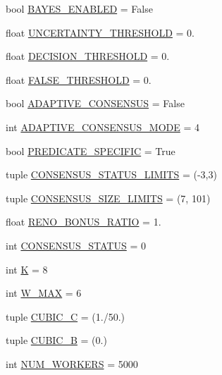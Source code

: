 \begin{DoxyCompactItemize}
\item 
bool \hyperlink{namespacereorder_adadcb301c2f0066591eaf0a4c08ac96d}{B\+A\+Y\+E\+S\+\_\+\+E\+N\+A\+B\+L\+ED} = False
\item 
float \hyperlink{namespacereorder_aaefdc27b85545eb4a910f5c65f7d8bbb}{U\+N\+C\+E\+R\+T\+A\+I\+N\+T\+Y\+\_\+\+T\+H\+R\+E\+S\+H\+O\+LD} = 0.
\item 
float \hyperlink{namespacereorder_ac4442b6c569574253ef445d09952d3f0}{D\+E\+C\+I\+S\+I\+O\+N\+\_\+\+T\+H\+R\+E\+S\+H\+O\+LD} = 0.
\item 
float \hyperlink{namespacereorder_a31317fa26792fa204392549329cc31cb}{F\+A\+L\+S\+E\+\_\+\+T\+H\+R\+E\+S\+H\+O\+LD} = 0.
\item 
bool \hyperlink{namespacereorder_a7b6800fe9bb5df8c84060ed96d9711ac}{A\+D\+A\+P\+T\+I\+V\+E\+\_\+\+C\+O\+N\+S\+E\+N\+S\+US} = False
\item 
int \hyperlink{namespacereorder_a394fa3f8531c2ecc987f982367a4af2d}{A\+D\+A\+P\+T\+I\+V\+E\+\_\+\+C\+O\+N\+S\+E\+N\+S\+U\+S\+\_\+\+M\+O\+DE} = 4
\item 
bool \hyperlink{namespacereorder_a2826a54e707f46fbd0fa2f8f6219ead7}{P\+R\+E\+D\+I\+C\+A\+T\+E\+\_\+\+S\+P\+E\+C\+I\+F\+IC} = True
\item 
tuple \hyperlink{namespacereorder_a36cac18f3d673a6f2cd86c88127e41b9}{C\+O\+N\+S\+E\+N\+S\+U\+S\+\_\+\+S\+T\+A\+T\+U\+S\+\_\+\+L\+I\+M\+I\+TS} = (-\/3,3)
\item 
tuple \hyperlink{namespacereorder_a1a20e4a8af9569eaef5eb5b23f07222b}{C\+O\+N\+S\+E\+N\+S\+U\+S\+\_\+\+S\+I\+Z\+E\+\_\+\+L\+I\+M\+I\+TS} = (7, 101)
\item 
float \hyperlink{namespacereorder_a18fd240c30a7c4a6ee9df12436a744ab}{R\+E\+N\+O\+\_\+\+B\+O\+N\+U\+S\+\_\+\+R\+A\+T\+IO} = 1.
\item 
int \hyperlink{namespacereorder_a090eab76b7b0e234f422b87e30adf793}{C\+O\+N\+S\+E\+N\+S\+U\+S\+\_\+\+S\+T\+A\+T\+US} = 0
\item 
int \hyperlink{namespacereorder_a2689c4b3931025b79053532a5f1b0a85}{K} = 8
\item 
int \hyperlink{namespacereorder_add63171ca968cbd5ca4d60dfbf9a2746}{W\+\_\+\+M\+AX} = 6
\item 
tuple \hyperlink{namespacereorder_a073a7aa1bc6b8c92d5682922759765fd}{C\+U\+B\+I\+C\+\_\+C} = (1./50.)
\item 
tuple \hyperlink{namespacereorder_a2d4f2e30d34616c754114da7b5c88000}{C\+U\+B\+I\+C\+\_\+B} = (0.)
\item 
int \hyperlink{namespacereorder_a806fc12166c09fa5baabfcbe218040ae}{N\+U\+M\+\_\+\+W\+O\+R\+K\+E\+RS} = 5000

\end{DoxyCompactItemize}
